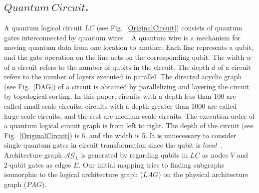 \documentclass[runningheads]{llncs}
\begin{document}
 \subsection{$Quantum \ Circuit$.}
 A quantum logical circuit $LC$ (see Fig.~\ref{OriginalCircuit}) consists of quantum gates interconnected by quantum wires~\cite{Daei2020}. A quantum wire is a mechanism for moving quantum data from one location to another. Each line represents a qubit, and the gate operation on the line acts on the corresponding qubit. The width $w$ of a circuit refers to the number of qubits in the circuit. The depth $d$ of a circuit refers to the number of layers executed in parallel. The directed acyclic graph (see Fig.~\ref{DAG}) of a circuit is obtained by parallelizing and layering the circuit by topological sorting. In this paper, circuits with a depth less than 100 are called small-scale circuits, circuits with a depth greater than 1000 are called large-scale circuits, and the rest are medium-scale circuits. The execution order of a quantum logical circuit graph is from left to right. The depth of the circuit (see Fig.~\ref{OriginalCircuit}) is 6, and the width is 5. It is unnecessary to consider single quantum gates in circuit transformation since the qubit is $local$~\cite{2013Optimization}. Architecture graph $\mathcal{AG}_{L}$  is generated by regarding qubits in $LC$ as nodes $V$  and 2-qubit gates as edges $E$. Our initial mapping tries to finding subgraphs isomorphic to the logical architecture graph ($LAG$) on the physical architecture graph ($PAG$).
\end{document}
